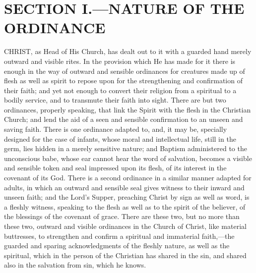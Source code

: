 \documentclass[]{book}
\begin{document}
\hypertarget{section-i.nature-of-the-ordinance-1}{%
\section{SECTION I.---NATURE OF THE ORDINANCE}\label{section-i.nature-of-the-ordinance-1}}

CHRIST, as Head of His Church, has dealt out to it with a guarded hand merely outward and visible rites. In the provision which He has made for it there is enough in the way of outward and sensible ordinances for creatures made up of flesh as well as spirit to repose upon for the strengthening and confirmation of their faith; and yet not enough to convert their religion from a spiritual to a bodily service, and to transmute their faith into sight. There are but two ordinances, properly speaking, that link the Spirit with the flesh in the Christian Church; and lend the aid of a seen and sensible confirmation to an unseen and saving faith. There is one ordinance adapted to, and, it may be, specially designed for the case of infants, whose moral and intellectual life, still in the germ, lies hidden in a merely sensitive nature; and Baptism administered to the unconscious babe, whose ear cannot hear the word of salvation, becomes a visible and sensible token and seal impressed upon its flesh, of its interest in the covenant of its God. There is a second ordinance in a similar manner adapted for adults, in which an outward and sensible seal gives witness to their inward and unseen faith; and the Lord's Supper, preaching Christ by sign as well as word, is a fleshly witness, speaking to the flesh as well as to the spirit of the believer, of the blessings of the covenant of grace. There are these two, but no more than these two, outward and visible ordinances in the Church of Christ, like material buttresses, to strengthen and confirm a spiritual and immaterial faith,---the guarded and sparing acknowledgments of the fleshly nature, as well as the spiritual, which in the person of the Christian has shared in the sin, and shared also in the salvation from sin, which he knows.
\end{document}
